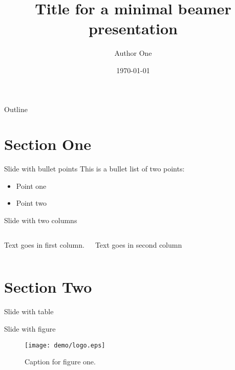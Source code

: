\documentclass[aspectratio=169]{beamer} %
\title{Title for a minimal beamer presentation}	%
\author{Author One}								%
\institute{Name of institution}					%
\date{\today}									%
\begin{document}
\begin{frame}
  \titlepage

  
\end{frame}

\begin{frame}{Outline}
  \tableofcontents
\end{frame}

%

\section{Section One}

\begin{frame}{Slide with bullet points}
	This is a bullet list of two points:
    \begin{itemize}
		\item Point one
        \item Point two
	\end{itemize}
\end{frame}

\begin{frame}{Slide with two columns}
	\begin{columns}
        Text goes in first column.
        
        Text goes in second column
	\end{columns}
\end{frame}

\section{Section Two}

\begin{frame}{Slide with table}
	
\end{frame}

\begin{frame}{Slide with figure}
	\begin{figure}[H]
		\centering
        \texttt{[image: demo/logo.eps]}
        \caption{Caption for figure one.}
        \label{fig:figure1}
	\end{figure}
\end{frame}
\end{document}
